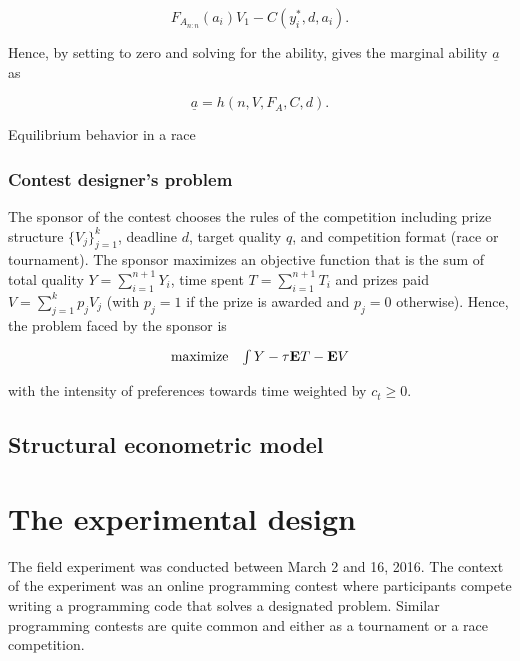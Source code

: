 \documentclass[12pt,]{article}
\begin{document}
\[\label{eq: expected payoffs tournament}
  {F_{A_{n:n}}}(a_i) V_1  - C(y_i^*, d, a_i).\]

Hence, by setting to zero and solving for the ability, gives the
marginal ability \({\underline a}\) as

\[{\underline a}= h(n, V, F_A, C, d).\]

\begin{corollary}

Equilibrium behavior in a race

\end{corollary}

\subsubsection{Contest designer's
problem}\label{contest-designers-problem}

The sponsor of the contest chooses the rules of the competition
including prize structure \(\{V_j\}_{j=1}^k\), deadline \(d\), target
quality \(q\), and competition format (race or tournament). The sponsor
maximizes an objective function that is the sum of total quality
\(Y=\sum_{i=1}^{n+1} Y_i\), time spent \(T=\sum_{i=1}^{n+1} T_i\) and
prizes paid \(V=\sum_{j=1}^k p_{j} V_j\) (with \(p_j=1\) if the prize is
awarded and \(p_j=0\) otherwise). Hence, the problem faced by the
sponsor is

\[\begin{array}{ll}
    \mbox{maximize} & \int {Y}   -  {\tau}{{\bf E}}{T} - {{\bf E}}{V}
  \end{array}\]

with the intensity of preferences towards time weighted by
\(c_t\geq 0\).

\subsection{Structural econometric
model}\label{structural-econometric-model}

\section{The experimental design}\label{the-experimental-design}

The field experiment was conducted between March 2 and 16, 2016. The
context of the experiment was an online programming contest where
participants compete writing a programming code that solves a designated
problem. Similar programming contests are quite common and either as a
tournament or a race competition.
\end{document}
